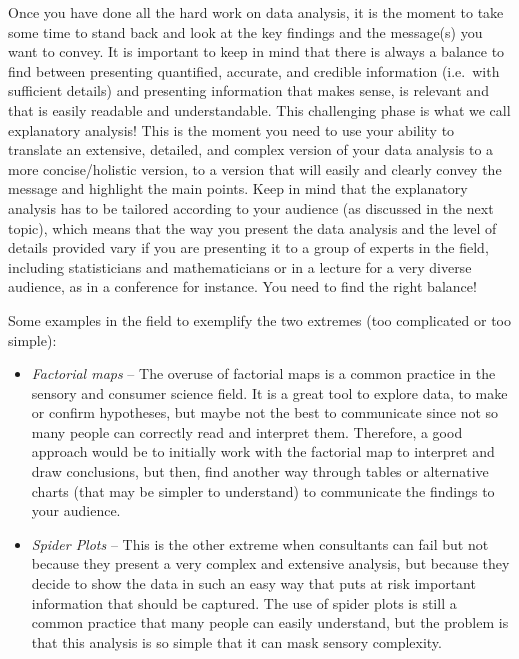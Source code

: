 \documentclass[
]{krantz}
\providecommand{\tightlist}{%
  \setlength{\itemsep}{0pt}\setlength{\parskip}{0pt}}
\begin{document}
Once you have done all the hard work on data analysis, it is the moment to take some time to stand back and look at the key findings and the message(s) you want to convey. It is important to keep in mind that there is always a balance to find between presenting quantified, accurate, and credible information (i.e.~with sufficient details) and presenting information that makes sense, is relevant and that is easily readable and understandable. This challenging phase is what we call explanatory analysis! This is the moment you need to use your ability to translate an extensive, detailed, and complex version of your data analysis to a more concise/holistic version, to a version that will easily and clearly convey the message and highlight the main points. Keep in mind that the explanatory analysis has to be tailored according to your audience (as discussed in the next topic), which means that the way you present the data analysis and the level of details provided vary if you are presenting it to a group of experts in the field, including statisticians and mathematicians or in a lecture for a very diverse audience, as in a conference for instance. You need to find the right balance!

Some examples in the field to exemplify the two extremes (too complicated or too simple):

\begin{itemize}
\tightlist
\item
  \emph{Factorial maps} -- The overuse of factorial maps is a common practice in the sensory and consumer science field. It is a great tool to explore data, to make or confirm hypotheses, but maybe not the best to communicate since not so many people can correctly read and interpret them. Therefore, a good approach would be to initially work with the factorial map to interpret and draw conclusions, but then, find another way through tables or alternative charts (that may be simpler to understand) to communicate the findings to your audience.
\item
  \emph{Spider Plots} -- This is the other extreme when consultants can fail but not because they present a very complex and extensive analysis, but because they decide to show the data in such an easy way that puts at risk important information that should be captured. The use of spider plots is still a common practice that many people can easily understand, but the problem is that this analysis is so simple that it can mask sensory complexity.
\end{itemize}
\end{document}
